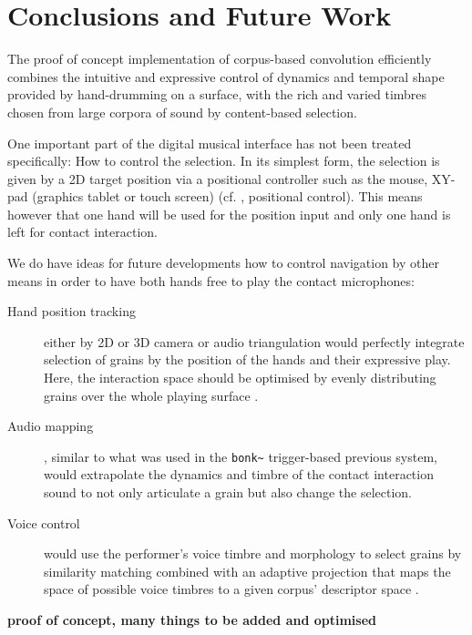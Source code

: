 \section{Conclusions and Future Work}

The proof of concept implementation of corpus-based convolution efficiently combines the intuitive and expressive control of dynamics and temporal shape provided by hand-drumming on a surface, with the rich and varied timbres chosen from large corpora of sound by content-based selection.


One important part of the digital musical interface has not been treated specifically: How to control the selection.  In its simplest form, the selection is given by a 2D target position via a positional controller such as the mouse, XY-pad (graphics tablet or touch screen) (cf. \cite{Schwarz-nime2012-sound-space}, positional control).
This means however that one hand will be used for the position input and only one hand is left for contact interaction.

We do have ideas for future developments how to control navigation by other means in order to have both hands free to play the contact microphones:

\begin{description}
\item[Hand position tracking] either by 2D or 3D camera or audio triangulation would perfectly integrate selection of grains by the position of the hands and their expressive play.  Here, the interaction space should be optimised by evenly distributing grains over the whole playing surface \cite{LallemandSchwarz-dafx2011-distribute}.
\item[Audio mapping], similar to what was used in the \verb|bonk~| trigger-based previous system, would extrapolate the dynamics and timbre of the contact interaction sound to not only articulate a grain but also change the selection.
\item[Voice control] would use the performer's voice timbre and morphology to select grains by similarity matching combined with an adaptive projection that maps the space of possible voice timbres to a given corpus' descriptor space \cite{StowellPlumbley-smc2010-timbre-remapping-regression-tree,Fasciani-si2013b}.
\end{description}

\textbf{proof of concept, many things to be added and optimised}


